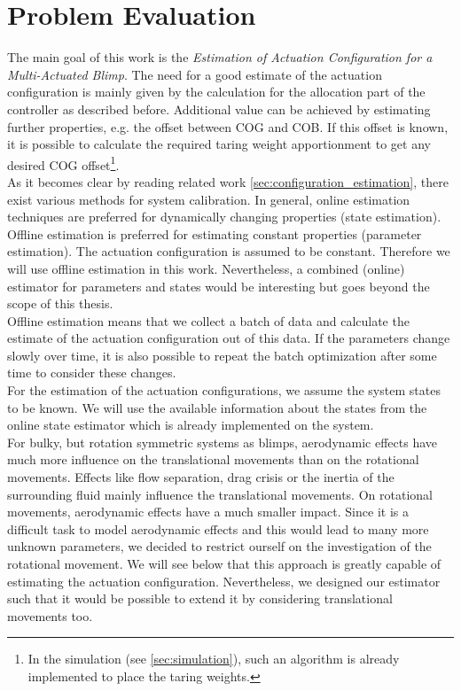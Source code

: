 \section{Problem Evaluation}
\label{sec:problem_evaluation}
The main goal of this work is the \textit{Estimation of Actuation Configuration for a Multi-Actuated Blimp}.
The need for a good estimate of the actuation configuration is mainly given by the calculation for the allocation part of the controller as described before.
Additional value can be achieved by estimating further properties, e.g. the offset between COG and COB.
If this offset is known, it is possible to calculate the required taring weight apportionment to get any desired COG offset\footnote{
In the simulation (see \cref{sec:simulation}), such an algorithm is already implemented to place the taring weights.
}.
\\

As it becomes clear by reading related work \ref{sec:configuration_estimation}, there exist various methods for system calibration.
In general, online estimation techniques are preferred for dynamically changing properties (state estimation).
Offline estimation is preferred for estimating constant properties (parameter estimation).
The actuation configuration is assumed to be constant.
Therefore we will use offline estimation in this work.
Nevertheless, a combined (online) estimator for parameters and states would be interesting but goes beyond the scope of this thesis.
\\

Offline estimation means that we collect a batch of data and calculate the estimate of the actuation configuration out of this data.
If the parameters change slowly over time, it is also possible to repeat the batch optimization after some time to consider these changes.
\\

For the estimation of the actuation configurations, we assume the system states to be known.
We will use the available information about the states from the online state estimator which is already implemented on the system.\\
For bulky, but rotation symmetric systems as blimps, aerodynamic effects have much more influence on the translational movements than on the rotational movements.
Effects like flow separation, drag crisis or the inertia of the surrounding fluid mainly influence the translational movements.
On rotational movements, aerodynamic effects have a much smaller impact.
Since it is a difficult task to model aerodynamic effects and this would lead to many more unknown parameters, we decided to restrict ourself on the investigation of the rotational movement.
We will see below that this approach is greatly capable of estimating the actuation configuration.
Nevertheless, we designed our estimator such that it would be possible to extend it by considering translational movements too.

